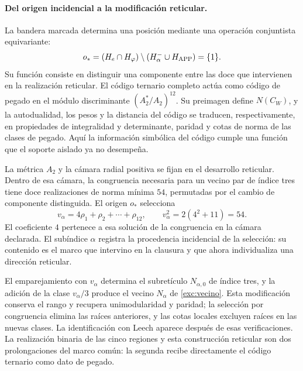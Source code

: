 \paragraph{Del origen incidencial a la modificación reticular.}
\label{inc-ampl-reticulo}
La bandera marcada determina una posición mediante una operación
conjuntista equivariante:
\[
 o_*=(H_e\cap H_\varphi)
       \setminus(H^-_\alpha\cup H_{\rm APP})=\{1\}.
\]
Su función consiste en distinguir una componente entre las doce que
intervienen en la realización reticular. El código ternario completo
actúa como código de pegado en el módulo discriminante
$(A_2^*/A_2)^{12}$. Su preimagen define $N(C_W)$, y la
autodualidad, los pesos y la distancia del código se traducen,
respectivamente, en propiedades de integralidad y determinante, paridad
y cotas de norma de las clases de pegado. Aquí la información simbólica
del código cumple una función que el soporte aislado ya no desempeña.

La métrica $A_2$ y la cámara radial positiva se fijan en el desarrollo
reticular. Dentro de esa cámara, la congruencia necesaria para un vecino
par de índice tres tiene doce realizaciones de norma mínima $54$,
permutadas por el cambio de componente distinguida. El origen $o_*$
selecciona
\[
 v_\alpha=4\rho_1+\rho_2+\cdots+\rho_{12},\qquad
 v_\alpha^2=2(4^2+11)=54.
\]
El coeficiente $4$ pertenece a esa solución de la congruencia en la
cámara declarada. El subíndice $\alpha$ registra la procedencia
incidencial de la selección: su contenido es el marco que intervino en
la clausura y que ahora individualiza una dirección reticular.

El emparejamiento con $v_\alpha$ determina el subretículo
$N_{\alpha,0}$ de índice tres, y la adición de la clase
$v_\alpha/3$ produce el vecino $N_\alpha$ de
\eqref{exc:vecino}. Esta modificación conserva el rango y recupera
unimodularidad y paridad; la selección por congruencia elimina las raíces
anteriores, y las cotas locales excluyen raíces en las nuevas clases.
La identificación con Leech aparece después de esas verificaciones. La
realización binaria de las cinco regiones y esta construcción reticular
son dos prolongaciones del marco común: la segunda recibe directamente
el código ternario como dato de pegado.

